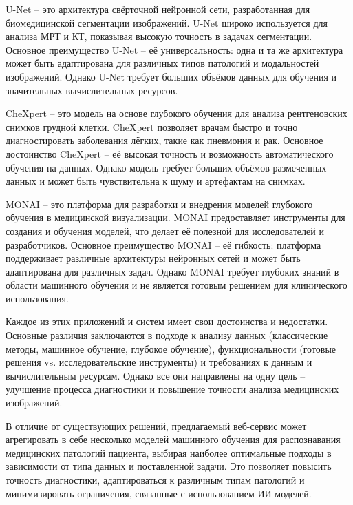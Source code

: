 {  \par \redline U-Net – это архитектура свёрточной нейронной сети, разработанная для биомедицинской сегментации изображений. U-Net широко используется для анализа МРТ и КТ, показывая высокую точность в задачах сегментации. Основное преимущество U-Net – её универсальность: одна и та же архитектура может быть адаптирована для различных типов патологий и модальностей изображений. Однако U-Net требует больших объёмов данных для обучения и значительных вычислительных ресурсов.

  \par \redline CheXpert – это модель на основе глубокого обучения для анализа рентгеновских снимков грудной клетки. CheXpert позволяет врачам быстро и точно диагностировать заболевания лёгких, такие как пневмония и рак. Основное достоинство CheXpert – её высокая точность и возможность автоматического обучения на данных. Однако модель требует больших объёмов размеченных данных и может быть чувствительна к шуму и артефактам на снимках.

  \par \redline MONAI – это платформа для разработки и внедрения моделей глубокого обучения в медицинской визуализации. MONAI предоставляет инструменты для создания и обучения моделей, что делает её полезной для исследователей и разработчиков. Основное преимущество MONAI – её гибкость: платформа поддерживает различные архитектуры нейронных сетей и может быть адаптирована для различных задач. Однако MONAI требует глубоких знаний в области машинного обучения и не является готовым решением для клинического использования.

  \par \redline Каждое из этих приложений и систем имеет свои достоинства и недостатки. Основные различия заключаются в подходе к анализу данных (классические методы, машинное обучение, глубокое обучение), функциональности (готовые решения vs. исследовательские инструменты) и требованиях к данным и вычислительным ресурсам. Однако все они направлены на одну цель – улучшение процесса диагностики и повышение точности анализа медицинских изображений.

  \par \redline В отличие от существующих решений, предлагаемый веб-сервис может агрегировать в себе несколько моделей машинного обучения для распознавания медицинских патологий пациента, выбирая наиболее оптимальные подходы в зависимости от типа данных и поставленной задачи. Это позволяет повысить точность диагностики, адаптироваться к различным типам патологий и минимизировать ограничения, связанные с использованием  ИИ-моделей.
  
  \par
}

